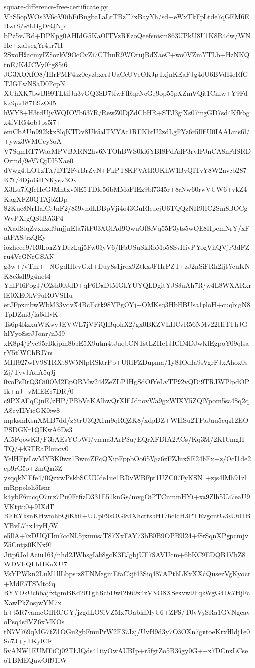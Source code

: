 \documentclass[11pt]{article}
\theoremstyle{definition}
\theoremstyle{remark}
\begin{document}
\begin{filecontents*}[overwrite]{square-difference-free-certificate.py}
VhS5opWOs3V6oV0ihEiBugbaLaLrTBzT7xBayYh/sd+eWxTkFpLtde7qGEM6ERwt8/e8bBgD8QNp
bPz5vJRd+DPKpg0AHIdG5KaOITVzREzoQeefenism863UPkU8U1K8R4dw/WNHe+xa1segYr4pr7H
2SxoH9acmyIZSozkV9OcCvZi7OThuR9WOrujBdXaeC+wo0VZmYTLb+HzNKQtnE/KdJCVy0bg85i6
JG3XQXfO8/IHrFMF4az0eyzbxcrJUaCeUVeOKJpTxjnKEaFJg4dU6BVdI4eRfGTJGEwNSaD0PcpN
XUhXK7bwBl99TLtifJn3vGQ3SD7tfwFfRqrNcGq9op55pXZmVQit1Cnlw+Y9Fdkx9px187ESzOd5
hWY8+H3tdUjvWQIOVb637R/RewZ0DjZdCbHR+STJ3giXs07mgGD7sd4Kfkbgx4fVR54obJps5i7+
emCbAUn992kkx8lqKTDv8Uk5alTVYAo1RFKhtU2zdLgFYz6r5llEU0IAALms6l/+ywz3WMCcySoA
V7SqmRT7WaeMPVBXRN2hv6NTOhBWS0ki6YBI8PdAdP3rvIPJnCA8nFdSRDOrmd/9eV7QjDI5Xae0
dVwg4tLOTzTA/DT2FvrBrZvN+FkPT8KPVAtRUKhW1BvQITvY8W2nvcb287K7t/4DjuGHNKysv3Ov
X3Lu7fQfcHeGJMntxvNE5TDld56bMMoFIEz9bl7345r+8rNw60rwVUW6+vkZ4KagXFZ0QTAjbZDp
82Kuc8NrHalCrJnF2/859vndkDBpVji4o43GuRleuejU6TQQzNH9HC2Sm8BOCgWvPXrgQStBA3P4
oXadSIqZvxnzol9mjjnEIa7itP03XQlAd9QwuOf8eVq55F3yts5wQE8HpemNrY/xFntPA8JrzQEy
iozhceq9/R0LonZYDezLqj5Fw03yV6/lFaUSuSkRoMo58SvHivPYogVhQVjP3dFZru4VcGNrGSAN
g3w+/vTm++NGgdIHevGxl+Duy8s1jrqx9ZtkxJFHrPZT+zJ2nSiFRh2ijtYcuKNK8c3sH9g4net4
YhfPf6PogJ/O2sh00JdD+qP6DaDtMGkYUYQLDgitYJS8uAh7R/w4L8WXARxrlE0XEOkV9uROVSHu
erJFpxmbwWbM33vqvX4BcEctk98YPgOYj+OMKsq3HbHBUsa1ploH+cuqbigN8TpDZm3/ia6dIvK+
Ts6p4l4zxuWKwvJEVWL7jVFiQIBqohX2/gx0BKZVLHCvR56NMv22HiTThJGhlYyoSsrJJonr/nM9
xK8p4/Pye95rBkjpm8boE5X9utm4tJuqbCNTstLZHe1JIOD4DJwKlEgpoY09qlsarY5tlWChBJ7m
MHf927wfV98TRXt8W5NlpRSktrPb+URfFZDupma/1y8dOdIa9sVgrFJxAhox0sZj/TyvJAdA5q9j
0voPsDrQ3Oi0OM2EpQRMw24dZeZLP1HgSdOfYeLvTP92vQDj9TRJWPlpdOPIk+nJ+vMiEEo7DR/0
c9PXAFqCjnE/zHP/PBbVaKAlhwQrXlFJdnovWa9gxWIXY5ZQlYpom5sa48q2qA8cyILYieGK0iw8
mpksmKsnXMlB7dd/zStrU3QX1m9qRQZK8/xdpDZ+WhlSu2TPaJuu5cqz12EOPSDGNr1QIKwA6Ds3
Ai5FqowK3/F3bAEsYCbWl/vmna3ArPSu/EQrXFDfA2ACs/Kq3M/2KIUmgII+TQ/+fGTRaPluuov0
YelHFjvLwMYBK0wz1BwmZFqQXipFppbOo65Vgz6zFZJuxSE24bEx+z/OcI1de2cp9rG5o+2mQm3Z
ysqqkNlFfe4/0QzxwPskbSCUUde1ue1RDvWBFpt1UZC07FyKSN1+zjs4lMh91zlmRppoloh5Isnr
k4ybF6mcqO7mz7Pu0FtfizD331E51knGs/mvgOiPTCummHYi+xa9Zlh5Ua7eaU9VKtjtu0+9IXdT
BFRYbsnKHwmhbQiK5iI+UUpF9sOGl83XhcrtsbH176cldH3PTRvgcntG3sU6I1BYBvL7hx1ryH/W
e5llA+7zDUQFIm7ccNL5jxmusaT87XxFAY73bB0B9OPB9l24+f8rSqnXPgpcmjvZ5Cntjz0KNx9l
Jitp6Jo1Aciu163/nhd2JWhsgIab8gcK3EJgbjUF7SAVUcm+6bKC9EDQB1VhZ8WDVBQLhIIKoXU7
VsYPWkn2LuM1llLbpsrz8TNMzgmEfaCkjf43Siq487APthLKxXXdQusezVgKyocr+MdF5TSMto9q
RYYDkUc6bajfxtgmBKd20TghBc5DwI2b69x4zVNO8XSexvw9FqkWgG4Dc7HjFcXawPkZosjwYM7x
h+t5R7vamcGHRCGY/jzgdLOSiVZ5Ix7OabkDIyU6+ZFS/T0vVySRa1GVNgeavoPsq4sdVZ6xMKOs
tN7V769qMG76Z1OGu2gbFmuPrW2E37Jzj/Uvf49d3y7O3OXn7gntoeKrxHldj1e0Se7J+yTKylCF
5vANW1EUMEiCj02ThJQds41ityOwAUBIp+r5fgtZo5B36gy0G++x7DCnxLCseoTBMEQuwOfl91iW

\end{filecontents*}
\end{document}
